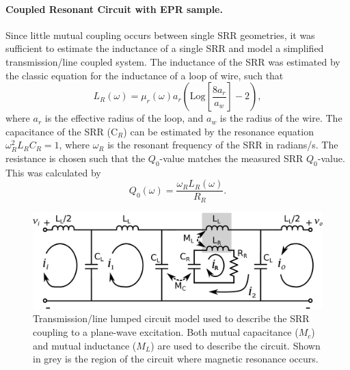 \noindent \paragraph*{Coupled Resonant Circuit with EPR sample.} Since little mutual coupling occurs between single SRR geometries, it was sufficient to estimate the inductance of a single SRR and model a simplified transmission\-/line coupled system. The inductance of the SRR was estimated by the classic equation for the inductance of a loop of wire, such that 
\begin{equation}
    L_R(\omega) = \mu_r(\omega) a_r \left(\text{Log}\left[ \frac{8 a_r}{a_w} \right] -2\right),
\end{equation}
where $a_r$ is the effective radius of the loop, and $a_w$ is the radius of the wire. \cite{ramo1984fields} The capacitance of the SRR (C$_R$) can be estimated by the resonance equation $\omega_R^2 L_RC_R=1$, where $\omega_R$ is the resonant frequency of the SRR in radians/s. The resistance is chosen such that the $Q_0$-value matches the measured SRR $Q_0$-value. This was calculated by
\begin{equation}
    Q_0(\omega) = \frac{\omega_R L_R(\omega)}{R_R}.
\end{equation}

\begin{figure}[htp]
\centering
   \includegraphics[width=\textwidth]{Kapitel/Ch3-Images/03-CircuitFig.eps}%
\caption[Transmission\-/line lumped circuit model.]{Transmission\-/line lumped circuit model used to describe the SRR coupling to a plane-wave excitation. Both mutual capacitance ($M_c$) and mutual inductance ($M_L$) are used to describe the circuit. Shown in grey is the region of the circuit where magnetic resonance occurs.}
  \label{ch3-fig:circuit}
\end{figure}

